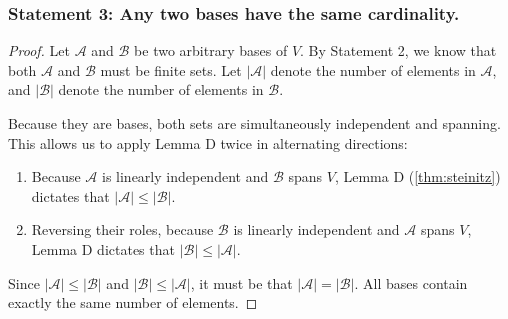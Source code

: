 \subsubsection*{Statement 3: Any two bases have the same cardinality.}

\begin{proof}
Let $\mathcal{A}$ and $\mathcal{B}$ be two arbitrary bases of $V$. By Statement 2, we know that both $\mathcal{A}$ and $\mathcal{B}$ must be finite sets. Let $|\mathcal{A}|$ denote the number of elements in $\mathcal{A}$, and $|\mathcal{B}|$ denote the number of elements in $\mathcal{B}$.

Because they are bases, both sets are simultaneously independent and spanning. This allows us to apply Lemma D twice in alternating directions:

\begin{center}
\end{center}

\begin{enumerate}
    \item Because $\mathcal{A}$ is linearly independent and $\mathcal{B}$ spans $V$, Lemma D (\cref{thm:steinitz}) dictates that $|\mathcal{A}| \le |\mathcal{B}|$.
    \item Reversing their roles, because $\mathcal{B}$ is linearly independent and $\mathcal{A}$ spans $V$, Lemma D dictates that $|\mathcal{B}| \le |\mathcal{A}|$.
\end{enumerate}

Since $|\mathcal{A}| \le |\mathcal{B}|$ and $|\mathcal{B}| \le |\mathcal{A}|$, it must be that $|\mathcal{A}| = |\mathcal{B}|$. All bases contain exactly the same number of elements.
\end{proof}

